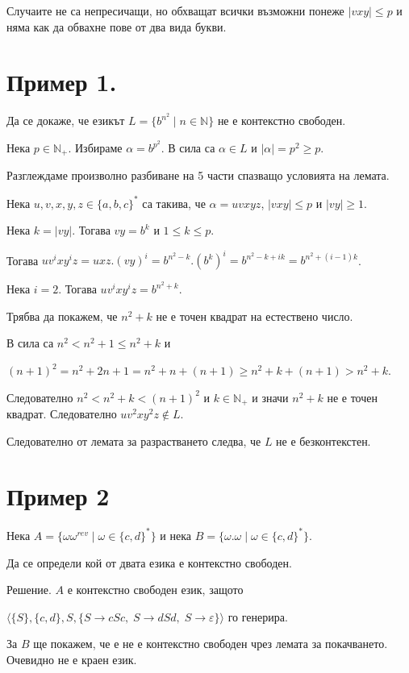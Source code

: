 \documentclass[12pt]{article}
\begin{document}
Случаите не са непресичащи, но обхващат всички възможни понеже \(|vxy| \leq p\) и няма как да обвахне пове от два вида букви.

\section*{Пример 1.}
Да се докаже, че езикът \(L = \{b^{n^2} \mid n \in \mathbb{N}\}\) не е контекстно свободен.

Нека \(p \in \mathbb{N}_+\). Избираме \(\alpha = b^{p^2}\). В сила са \(\alpha \in L\) и \(|\alpha| = p^2 \geq p\).

Разглеждаме произволно разбиване на 5 части спазващо условията на лемата.

Нека \(u, v, x, y, z \in \{a, b, c\}^*\) са такива, че \(\alpha = uvxyz\), \(|vxy| \leq p\) и \(|vy| \geq 1\).

Нека \(k = |vy|\). Тогава \(vy = b^k\) и \(1 \leq k \leq p\).

Тогава \(uv^ixy^iz = uxz.(vy)^i = b^{n^2 - k}.(b^k)^i = b^{n^2 - k + ik} = b^{n^2 + (i - 1)k}\).

Нека \(i = 2\). Тогава \(uv^ixy^iz = b^{n^2 + k}\).

Трябва да покажем, че \(n^2 + k\) не е точен квадрат на естествено число.

В сила са \(n^2 < n^2 + 1 \leq n^2 + k\) и

\((n + 1)^2 = n^2 + 2n + 1 = n^2 + n + (n + 1) \geq n^2 + k + (n + 1) > n^2 + k\).

Следователно \(n^2 < n^2 + k < (n + 1)^2\) и \(k \in \mathbb{N}_+\) и значи \(n^2 + k\) не е точен квадрат.
Следователно \(uv^2xy^2z \notin L\).

Следователно от лемата за разрастването следва, че \(L\) не е безконтекстен.

\section*{Пример 2}
Нека \(A = \{\omega \omega^{rev} \mid \omega \in \{c, d\}^*\}\) и нека \(B = \{\omega.\omega \mid \omega \in \{c, d\}^*\}\).

Да се определи кой от двата езика е контекстно свободен.

Решение. \(A\) е контекстно свободен език, защото

\(\langle \{S\}, \{c, d\}, S, \{S \to cSc,\; S \to dSd,\; S \to \varepsilon\} \rangle\) го генерира.

За \(B\) ще покажем, че е не е контекстно свободен чрез лемата за покачването. Очевидно не е краен език.
\end{document}
